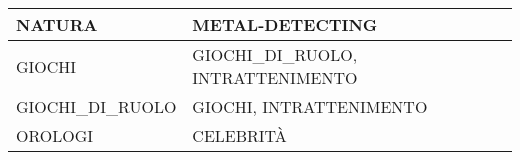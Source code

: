 \documentclass[11pt]{article}
\begin{document}
\begin{table*}
\begin{tabular}{lll}
  NATURA                   & METAL-DETECTING                                                                                                                                       \\ \hline
  GIOCHI                   & GIOCHI\_DI\_RUOLO, INTRATTENIMENTO                                                                                                                    \\ \hline
  GIOCHI\_DI\_RUOLO        & GIOCHI, INTRATTENIMENTO                                                                                                                               \\ \hline
  OROLOGI                  & CELEBRITÀ                                                                                                                                             \\ \hline
  \end{tabular}
  \caption{Example commands for accented characters, to be used in, \emph{e.g.}, Bib\TeX{} entries.}
\end{table*}
\end{document}
